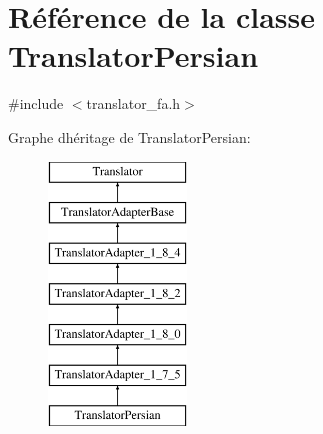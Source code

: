 \hypertarget{class_translator_persian}{}\section{Référence de la classe Translator\+Persian}
\label{class_translator_persian}


{\ttfamily \#include $<$translator\+\_\+fa.\+h$>$}

Graphe d\textquotesingle{}héritage de Translator\+Persian\+:\begin{figure}[H]
\begin{center}
\leavevmode
\includegraphics[height=7.000000cm]{class_translator_persian}
\end{center}
\end{figure}
